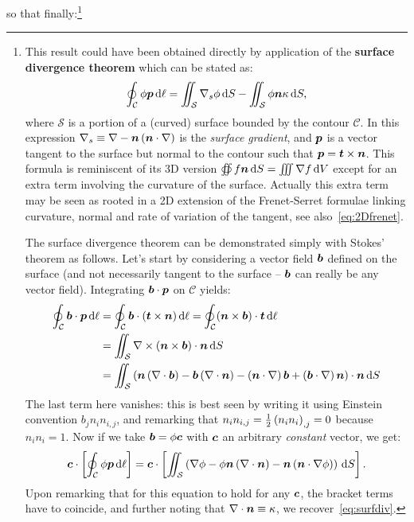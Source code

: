 so that finally:\footnote{This result could have been obtained directly by application of the \textbf{surface divergence theorem} which can be stated as:
\begin{equation}
\oint_{\mathcal C} \phi \bp \,\mathrm d\ell = \iint_\mathcal S \nabla_s \phi \,\mathrm dS - \iint_\mathcal S \phi \bn \kappa\,\mathrm dS,
\label{eq:surfdiv}
\end{equation}
where $\mathcal S$ is a portion of a (curved) surface bounded by the contour $\mathcal C$. In this expression $\nabla_s\equiv\nabla-\bn\lp\bn\cdot\nabla\rp$ is the \textit{surface gradient}, and $\bp$ is a vector tangent to the surface but normal to the contour such that $\bp = \bt \times \bn$. This formula is reminiscent of its 3D version $\oiint f \bn \, \mathrm dS = \iiint \nabla f \, \mathrm dV$ except for an extra term involving the curvature of the surface. Actually this extra term may be seen as rooted in a 2D extension of the Frenet-Serret formulae linking curvature, normal and rate of variation of the tangent, see also~\eqref{eq:2Dfrenet}.

\noindent The surface divergence theorem can be demonstrated simply with Stokes' theorem as follows. Let's start by considering a vector field $\bb$ defined on the surface (and not necessarily tangent to the surface -- $\bb$ can really be any vector field). Integrating $\bb\cdot\bp$ on $\mathcal C$ yields:
\begin{alignat*}{1}
\oint_\mathcal C \bb\cdot\bp\,\mathrm d\ell &= \oint_\mathcal C \bb\cdot(\bt\times\bn)\,\mathrm d\ell = \oint_\mathcal C (\bn\times\bb)\cdot\bt\,\mathrm d\ell\\
&= \iint_\mathcal S \nabla\times\lp\bn\times\bb\rp\cdot\bn\,\mathrm dS\\
&=\iint_\mathcal S\lp\bn\lp\nabla\cdot\bb\rp - \bb\lp\nabla\cdot\bn\rp-\lp\bn\cdot\nabla\rp\bb+\lp\bb\cdot\nabla\rp\bn\rp\cdot\bn\,\mathrm dS
\end{alignat*}
The last term here vanishes: this is best seen by writing it using Einstein convention $b_j n_i n_{i,j}$, and remarking that $n_i n_{i,j} = \tfrac{1}{2} \left( n_i n_i \right)_{,j} = 0$ because $n_i n_i = 1$. Now if we take $\bb = \phi \bc$ with $\bc$ an arbitrary \textit{constant} vector, we get:
\begin{equation}
\bc\cdot\left[\oint_\mathcal C \phi \bp\,\mathrm d\ell\right] = \bc\cdot\left[\iint_\mathcal S \lp\nabla \phi -\phi\bn\lp\nabla\cdot\bn\rp-\bn\lp\bn\cdot\nabla\phi\rp\rp\,\mathrm dS \right].
\end{equation}
Upon remarking that for this equation to hold for any $\bc$, the bracket terms have to coincide, and further noting that $\nabla\cdot\bn\equiv\kappa$, we recover~\eqref{eq:surfdiv}.

}
